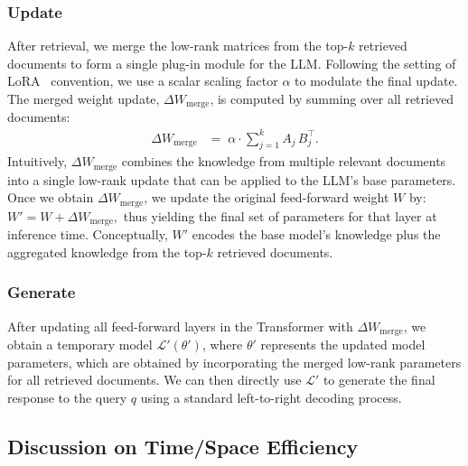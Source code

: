 \documentclass[sigconf,natbib=true,anonymous=false]{acmart}
\begin{document}
\subsubsection{Update}
After retrieval, we merge the low-rank matrices from the top-\(k\) retrieved documents to form a single plug-in module for the LLM. 
Following the setting of LoRA~\cite{hulora} convention, we use a scalar scaling factor \(\alpha\) to modulate the final update. 
The {merged} weight update, \(\Delta W_{\text{merge}}\), is computed by summing over all retrieved documents:
%
\begin{align}
\label{eq:merged_update}
    \Delta W_{\text{merge}}
    &=\; \alpha \cdot
    \sum_{j=1}^{k} A_{j}\,B_{j}^\top
    .
\end{align}
Intuitively, \(\Delta W_{\text{merge}}\) combines the knowledge from multiple relevant documents into a single low-rank update that can be applied to the LLM’s base parameters.
Once we obtain \(\Delta W_{\text{merge}}\), we update the original feed-forward weight \(W\) by:
    $W' = W + \Delta W_{\text{merge}},$
thus yielding the final set of parameters for that layer at inference time. 
Conceptually, \(W'\) encodes the base model’s knowledge plus the aggregated knowledge from the top-\(k\) retrieved documents. 

\subsubsection{Generate}
After updating all feed-forward layers in the Transformer with \(\Delta W_{\text{merge}}\), we obtain a temporary model $\mathcal{L}'({\theta}')$, where \(\theta'\) represents the updated model parameters, which are obtained by incorporating the merged low-rank parameters for all retrieved documents.
We can then directly use \(\mathcal{L}'\) to generate the final response to the query \(q\) using a standard left-to-right decoding process. 


\subsection{Discussion on Time/Space Efficiency}
\end{document}
